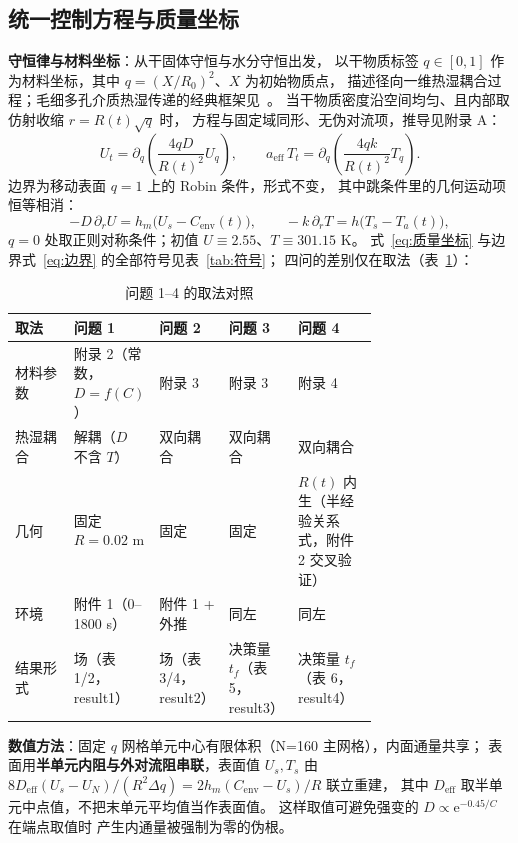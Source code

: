 \documentclass[12pt,a4paper]{ctexart}
\numberwithin{equation}{section}
\begin{document}
\subsection{统一控制方程与质量坐标}
\textbf{守恒律与材料坐标}：从干固体守恒与水分守恒出发，
以干物质标签 $q\in[0,1]$ 作为材料坐标，其中 $q=(X/R_0)^2$、$X$ 为初始物质点，
描述径向一维热湿耦合过程；毛细多孔介质热湿传递的经典框架见~\cite{luikov}。
当干物质密度沿空间均匀、且内部取仿射收缩 $r=R(t)\sqrt q$ 时，
方程与固定域同形、无伪对流项，推导见附录 A：
\begin{equation}
U_t=\partial_q\!\left(\frac{4qD}{R(t)^2}U_q\right),\qquad
a_{\mathrm{eff}}\,T_t=\partial_q\!\left(\frac{4qk}{R(t)^2}T_q\right).
\label{eq:质量坐标}
\end{equation}
边界为移动表面 $q=1$ 上的 Robin 条件，形式不变，
其中跳条件里的几何运动项恒等相消：
\begin{equation}
-D\,\partial_rU=h_m\bigl(U_s-C_{\mathrm{env}}(t)\bigr),\qquad
-k\,\partial_rT=h\bigl(T_s-T_a(t)\bigr),
\label{eq:边界}
\end{equation}
$q=0$ 处取正则对称条件；初值 $U\equiv2.55$、$T\equiv301.15$ K。
式~\eqref{eq:质量坐标} 与边界式~\eqref{eq:边界} 的全部符号见表~\ref{tab:符号}；
四问的差别仅在取法（表~\ref{tab:设定}）：

\begin{table}[htbp]
\centering
\caption{问题 1--4 的取法对照}
\label{tab:设定}
\small
\begin{tabular}{lp{0.17\linewidth}p{0.16\linewidth}p{0.17\linewidth}p{0.22\linewidth}}
\toprule
取法 & 问题 1 & 问题 2 & 问题 3 & 问题 4 \\
\midrule
材料参数 & 附录 2（常数，$D=f(C)$） & 附录 3 & 附录 3 & 附录 4 \\
热湿耦合 & 解耦（$D$ 不含 $T$） & 双向耦合 & 双向耦合 & 双向耦合 \\
几何 & 固定 $R=0.02$ m & 固定 & 固定 & $R(t)$ 内生（半经验关系式，附件 2 交叉验证） \\
环境 & 附件 1（0--1800 s） & 附件 1 + 外推 & 同左 & 同左 \\
结果形式 & 场（表 1/2，result1） & 场（表 3/4，result2） & 决策量 $t_f$（表 5，result3） & 决策量 $t_f$（表 6，result4） \\
\bottomrule
\end{tabular}
\end{table}

\textbf{数值方法}：固定 $q$ 网格单元中心有限体积（N=160 主网格），内面通量共享；
表面用\textbf{半单元内阻与外对流阻串联}，表面值 $U_s,T_s$ 由
$8D_{\mathrm{eff}}(U_s-U_N)/(R^2\Delta q)=2h_m(C_{\mathrm{env}}-U_s)/R$ 联立重建，
其中 $D_{\mathrm{eff}}$ 取半单元中点值，不把末单元平均值当作表面值。
这样取值可避免强变的 $D\propto\mathrm e^{-0.45/C}$ 在端点取值时
产生内通量被强制为零的伪根。
\end{document}

